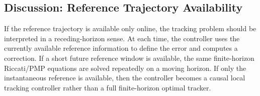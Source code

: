 \subsection{Discussion: Reference Trajectory Availability}

If the reference trajectory is available only online, the tracking problem should be interpreted in a receding-horizon sense. At each time, the controller uses the currently available reference information to define the error and computes a correction. If a short future reference window is available, the same finite-horizon Riccati/PMP equations are solved repeatedly on a moving horizon. If only the instantaneous reference is available, then the controller becomes a causal local tracking controller rather than a full finite-horizon optimal tracker.

